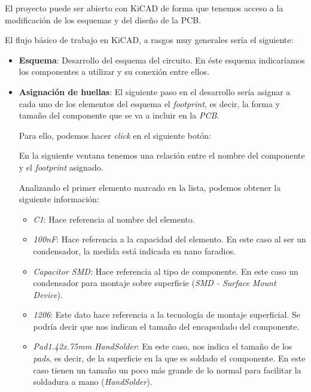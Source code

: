 El proyecto puede ser abierto con KiCAD de forma que tenemos acceso a la modificación de los esquemas y del diseño de la PCB.

El flujo básico de trabajo en KiCAD, a rasgos muy generales sería el siguiente:
\begin{itemize}
\item
\textbf{Esquema}: Desarrollo del esquema del circuito. En éste esquema indicaríamos los componentes a utilizar y su conexión entre ellos.

\item
\textbf{Asignación de huellas}: El siguiente paso en el desarrollo sería asignar a cada uno de los elementos del esquema el \emph{footprint}, es decir, la forma y tamaño del componente que se va a incluir en la \emph{PCB}.

Para ello, podemos hacer \emph{click} en el siguiente botón:


En la siguiente ventana tenemos una relación entre el nombre del componente y el \emph{footprint} asignado.


Analizando el primer elemento marcado en la lista, podemos obtener la siguiente información:

\begin{itemize}
\item
\textit{C1}: Hace referencia al nombre del elemento.
\item
\textit{100nF}: Hace referencia a la capacidad del elemento. En este caso al ser un condensador, la medida está indicada en nano faradios.
\item
\textit{Capacitor SMD:} Hace referencia al tipo de componente. En este caso un condensador para montaje sobre superficie (\emph{SMD - Surface Mount Device}).
\item
\textit{1206}: Este dato hace referencia a la tecnología de montaje superficial. Se podría decir que nos indican el tamaño del encapsulado del componente.
\item
\textit{Pad1.42x.75mm HandSolder}: En este caso, nos indica el tamaño de los \emph{pads}, es decir, de la superficie en la que es soldado el componente. En este caso tienen un tamaño un poco más grande de lo normal para facilitar la soldadura a mano (\emph{HandSolder}).
\end{itemize}


\end{itemize}
